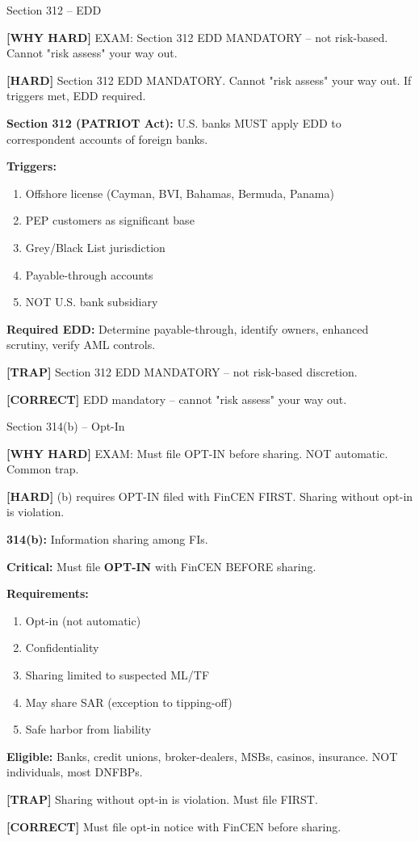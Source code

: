 \documentclass[6pt,aspectratio=169,fontsize=5pt]{beamer}
\renewcommand{\tiny}{\fontsize{3.5pt}{4.5pt}\selectfont}
\renewcommand{\normalsize}{\fontsize{7.5pt}{8.5pt}\selectfont}
\newcommand{\trap}[1]{%
	\begin{block}{\textcolor{redtrap}{\textbf{[TRAP]}}}
		\textcolor{redtrap}{\tiny #1}
	\end{block}
}
\newcommand{\correct}[1]{%
	\begin{block}{\textcolor{greencorrect}{\textbf{[CORRECT]}}}
		\textcolor{greencorrect}{\tiny #1}
	\end{block}
}
\newcommand{\hard}[1]{%
	\begin{block}{\textcolor{hardcolor}{\textbf{[HARD]}}}
		\textcolor{hardcolor}{\tiny #1}
	\end{block}
}
\newcommand{\hardexplain}[1]{%
	\begin{block}{\textcolor{orangehard}{\textbf{[WHY HARD]}}}
		\textcolor{orangehard}{\tiny #1}
	\end{block}
}
\begin{document}
	\begin{frame}{\normalsize Section 312 -- EDD}
		
		\hardexplain{EXAM: Section 312 EDD MANDATORY -- not risk-based. Cannot "risk assess" your way out.}
		
		\hard{Section 312 EDD MANDATORY. Cannot "risk assess" your way out. If triggers met, EDD required.}
		
		\textbf{Section 312 (PATRIOT Act):} U.S. banks MUST apply EDD to correspondent accounts of foreign banks.
		
		\textbf{Triggers:}
		\begin{enumerate}
			\item Offshore license (Cayman, BVI, Bahamas, Bermuda, Panama)
			\item PEP customers as significant base
			\item Grey/Black List jurisdiction
			\item Payable-through accounts
			\item NOT U.S. bank subsidiary
		\end{enumerate}
		
		\textbf{Required EDD:} Determine payable-through, identify owners, enhanced scrutiny, verify AML controls.
		
		\trap{Section 312 EDD MANDATORY -- not risk-based discretion.}
		
		\correct{EDD mandatory -- cannot "risk assess" your way out.}
	\end{frame}
	
	\begin{frame}{\normalsize Section 314(b) -- Opt-In}
		
		\hardexplain{EXAM: Must file OPT-IN before sharing. NOT automatic. Common trap.}
		
		\hard{314(b) requires OPT-IN filed with FinCEN FIRST. Sharing without opt-in is violation.}
		
		\textbf{314(b):} Information sharing among FIs.
		
		\textbf{Critical:} Must file \textbf{OPT-IN} with FinCEN BEFORE sharing.
		
		\textbf{Requirements:}
		\begin{enumerate}
			\item Opt-in (not automatic)
			\item Confidentiality
			\item Sharing limited to suspected ML/TF
			\item May share SAR (exception to tipping-off)
			\item Safe harbor from liability
		\end{enumerate}
		
		\textbf{Eligible:} Banks, credit unions, broker-dealers, MSBs, casinos, insurance. NOT individuals, most DNFBPs.
		
		\trap{Sharing without opt-in is violation. Must file FIRST.}
		
		\correct{Must file opt-in notice with FinCEN before sharing.}
	\end{frame}
	
\end{document}
